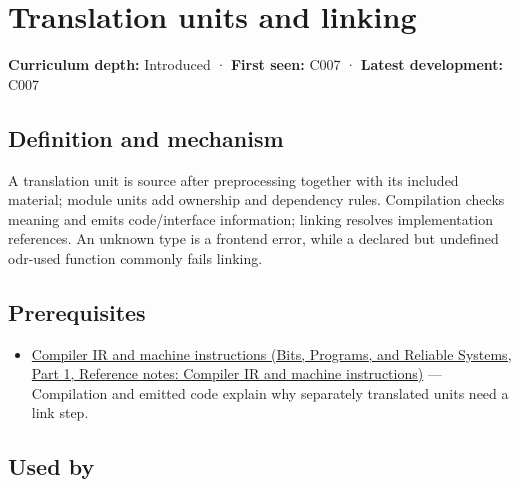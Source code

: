 \hypertarget{appendix-806686359e1b}{}\label{referencestart:appendix-806686359e1b}
\section{Translation units and linking}\label{appendix-806686359e1b-translation-units-and-linking}

\hypertarget{appendix-806686359e1b-translation-units-and-linking}{}

\textbf{Curriculum depth:} Introduced · \textbf{First seen:} C007 · \textbf{Latest development:} C007

\begin{allmightroledefinition}

\subsection{Definition and mechanism}\label{appendix-806686359e1b-definition-and-mechanism}

\hypertarget{appendix-806686359e1b-definition-and-mechanism}{}

A translation unit is source after preprocessing together with its included material; module units add ownership and dependency rules. Compilation checks meaning and emits code/interface information; linking resolves implementation references. An unknown type is a frontend error, while a declared but undefined odr-used function commonly fails linking.

\end{allmightroledefinition}

\subsection{Prerequisites}\label{appendix-806686359e1b-prerequisites}

\hypertarget{appendix-806686359e1b-prerequisites}{}

\begin{itemize}
\tightlist
\item
  \href{../01-Bits-Programs-and-Reliable-Systems-P01/main.pdf\#nameddest=appendix-942ad41afb30}{Compiler IR and machine instructions (Bits, Programs, and Reliable Systems, Part 1, Reference notes: Compiler IR and machine instructions)} --- Compilation and emitted code explain why separately translated units need a link step.
\end{itemize}

\subsection{Used by}\label{appendix-806686359e1b-used-by}

